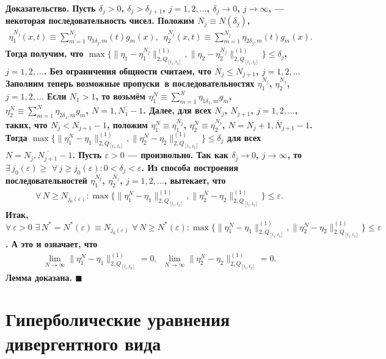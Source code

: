 \documentclass{report}
\newenvironment{Proof}{\par\noindent\bf Доказательство.\rm}{ $\blacksquare$\par}
\begin{document}
\begin{Proof}
Пусть $\delta_j>0$, $\delta_j>\delta_{j+1}$, $j=1,2,\dots$, $\delta_j\to0$, $j\to\infty$, --- некоторая последовательность чисел. Положим $N_j\equiv N(\delta_j)$,
\begin{gather*}
\eta_1^{N_j}(x,t)\equiv\sum\limits_{m=1}^{N_j}\eta_{1\delta_j,m}(t)g_m(x),\,\,\,\eta_2^{N_j}(x,t)\equiv\sum\limits_{m=1}^{N_j}\eta_{2\delta_j,m}(t)g_m(x).
\end{gather*}
Тогда получим, что $\max\{\|\eta_1-\eta_1^{N_j}\|^{(1)}_{2,Q_{[t_1,t_2]}},\|\eta_2-\eta_2^{N_j}\|^{(1)}_{2,Q_{[t_1,t_2]}}\}\leqslant\delta_j$, $j=1,2,\dots$. Без ограничения общности
считаем, что $N_j\leqslant N_{j+1}$, $j=1,2,\dots$ Заполним теперь возможные \glqq пропуски\grqq\ в последовательностях $\eta_1^{N_j}$, $\eta_2^{N_j}$, $j=1,2,\dots$ Если $N_1>1$, то
возьмём $\eta_1^N\equiv\sum\limits_{m=1}^N\eta_{1\delta_1,m}g_m$, $\eta_2^N\equiv\sum\limits_{m=1}^N\eta_{2\delta_1,m}g_m$, $N=\overline{1,N_1-1}$. Далее, для всех $N_j$, $N_{j+1}$,
$j=1,2,\dots$, таких, что $N_j<N_{j+1}-1$, положим $\eta_1^N\equiv \eta_1^{N_j}$, $\eta_2^N\equiv\eta_2^{N_j}$, $N=\overline{N_j+1,N_{j+1}-1}$. Тогда
$\max\{\|\eta_1^N-\eta_1\|^{(1)}_{2,Q_{[t_1,t_2]}},\|\eta_2^N-\eta_2\|^{(1)}_{2,Q_{[t_1,t_2]}}\}\leqslant\delta_j$ для всех $N=\overline{N_j,N_{j+1}-1}$. Пусть $\varepsilon>0$ ---
произвольно. Так как  $\delta_j\to0$, $j\to\infty$, то $\exists\,j_0(\varepsilon)\geqslant\,\,\forall\,j\geqslant j_0(\varepsilon):0<\delta_j<\varepsilon$. Из способа построения
последовательностей  $\eta_1^{N_j}$, $\eta_2^{N_j}$, $j=1,2,\dots$, вытекает, что
\begin{gather*}
\forall\,N\geqslant N_{j_0(\varepsilon)}: \max\{\|\eta_1^N-\eta_1\|^{(1)}_{2,Q_{[t_1,t_2]}},\|\eta_2^N-\eta_2\|^{(1)}_{2,Q_{[t_1,t_2]}}\}\leqslant\varepsilon.
\end{gather*}
Итак, $\forall\,\varepsilon>0\,\,\exists\,N^*=N^*(\varepsilon)\equiv N_{j_0(\varepsilon)}\,\, \forall\,N\geqslant N^*(\varepsilon):\max\{\|\eta_1^N-\eta_1\|^{(1)}_{2,Q_{[t_1,t_2]}},
\|\eta_2^N-\eta_2\|^{(1)}_{2,Q_{[t_1,t_2]}}\}\leqslant\varepsilon$. А это и означает, что
\begin{gather*}
\lim\limits_{N\to\infty}\|\eta^N_1-\eta_1\|^{(1)}_{2,Q_{[t_1,t_2]}}=0,\,\,\,\lim\limits_{N\to\infty}\|\eta^N_2-\eta_2\|^{(1)}_{2,Q_{[t_1,t_2]}}=0.
\end{gather*}
Лемма доказана.
\end{Proof}

\part{Гиперболические уравнения дивергентного вида}
\end{document}
